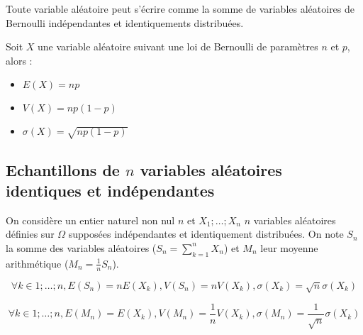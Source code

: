 \begin{corollary}
    Toute variable aléatoire peut s'écrire comme la somme de variables aléatoires de Bernoulli indépendantes et identiquements distribuées.
\end{corollary}

\begin{corollary}
    Soit \(X\) une variable aléatoire suivant une loi de Bernoulli de paramètres \(n \) et \(p\), alors : 
    \begin{itemize}
        \item \(E(X) = np\)
        \item \(V(X) = np(1-p)\) 
        \item \(\sigma(X) = \sqrt{np(1-p)}\) 
    \end{itemize}
\end{corollary}

\subsection{Echantillons de \(n\) variables aléatoires identiques et indépendantes}

On considère un entier naturel non nul \(n\) et \(X_{1};\dots;X_{n}\) \(n\) variables aléatoires définies sur \(\Omega \) supposées indépendantes et identiquement distribuées. On note \(S_{n}\) la somme des variables aléatoires (\(S_{n} = \sum_{k=1}^{n}X_{n}\)) et \(M_{n }\) leur moyenne arithmétique (\(M_{n} = \frac{1}{n}S_{n}\)).
\begin{corollary}
    \[
        \forall k \in {1;\dots;n}, E(S_{n}) = nE(X_{k}), V(S_{n}) = nV(X_{k}), \sigma(X_{k}) = \sqrt{n}\sigma(X_{k})
    \]
\end{corollary}

\begin{corollary}
    \[
        \forall k \in {1;\dots;n}, E(M_{n}) = E(X_{k}), V(M_{n}) = \frac{1}{n}V(X_{k}), \sigma(M_{n}) = \frac{1}{\sqrt{n}} \sigma(X_{k})
    \]
\end{corollary}